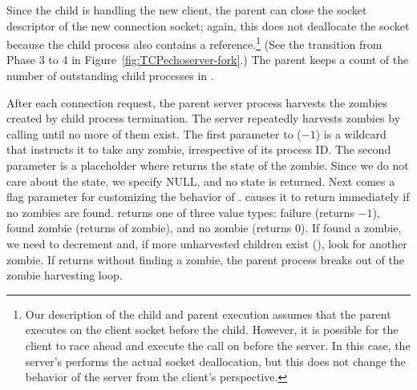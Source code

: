 \begin{topcode}
\begin{bottomcode}

Since the child is handling the new client, the parent can close the
socket descriptor of the new connection socket; again,
this does not deallocate
the socket because the child process also contains a
reference.\footnote{Our description of the child
and parent execution assumes that the parent executes
 on
the client socket before the child. However, it is possible for the
client to race ahead and execute the  call on
 before the server.  In this case, the server's 
performs the actual socket deallocation, but this does not change the
behavior of the server from the client's perspective.}
(See the transition from Phase 3 to 4 in
Figure~\ref{fig:TCPechoserver-fork}.)  
The parent keeps a count of the number of outstanding child processes
in .


After each connection request, the parent server process harvests the
zombies created by child process termination.  The server repeatedly harvests
zombies by calling  until no more of them exist.  The
first parameter to  ($-1$) is a wildcard that instructs it to
take any zombie, irrespective of its process ID.  The second parameter is a
placeholder where  returns the state of the
zombie.  Since we do not care about the state, we specify NULL, and no state
is returned.  Next comes a flag parameter for customizing the behavior
of .  
causes it to return immediately 
if no zombies are
found.   returns one of three value types:
failure (returns $-1$), found zombie (returns  of zombie), and no
zombie (returns $0$).  If  found a zombie,
we need
to decrement  and, if more unharvested children
exist (),
look for another zombie.  If  returns without
finding a zombie, the parent process breaks out of the zombie
harvesting loop. 
\end{bottomcode}

\end{topcode}

